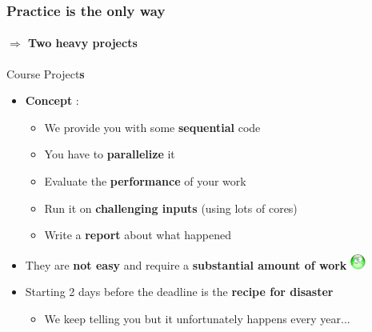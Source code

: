 \documentclass[10pt]{beamer}
\begin{document}
\begin{frame}
  \frametitle{\textbf{Practice} is the only way}
  \framesubtitle{$\Rightarrow$ Two heavy projects }
  \begin{block}{Course Project\textbf{s}}
    \begin{itemize}
      
    \item \textbf{Concept} :
      \begin{itemize}
      \item We provide you with some \textbf{sequential} code
      \item You have to \textbf{parallelize} it
      \item Evaluate the \textbf{performance} of your work
      \item Run it on \textbf{challenging inputs} (using lots of cores)
      \item Write a \textbf{report} about what happened
      \end{itemize}
  
      \medskip

    \item They are \textbf{not easy} and require a \textbf{substantial amount of work} \includegraphics[width=0.5cm,trim=0 17mm 0 0]{triste}
      
      \medskip
      
    \item Starting 2 days before the deadline is the \textbf{recipe for disaster}
      \begin{itemize}
      \item We keep telling you but it unfortunately happens every year...
      \end{itemize}
    \end{itemize}
  \end{block} 
\end{frame}

\end{document}
